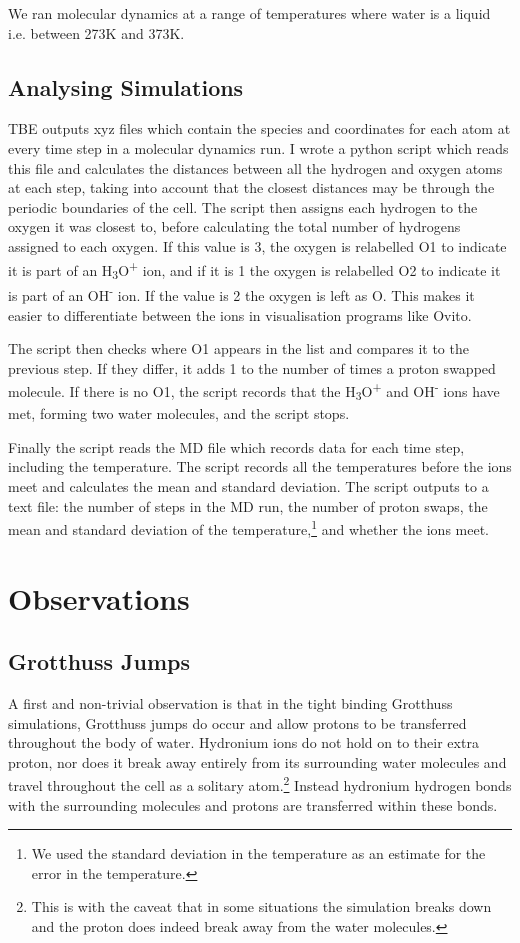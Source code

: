 \documentclass{article}
\begin{document}
\begin{multicols}{2}
We ran molecular dynamics at a range of temperatures where water is a liquid i.e. between 273K and 373K.

\subsection{Analysing Simulations}
\label{sec:analysis}
TBE outputs xyz files which contain the species and coordinates for each atom at every time step in a molecular dynamics run. I wrote a python script which reads this file and calculates the distances between all the hydrogen and oxygen atoms at each step, taking into account that the closest distances may be through the periodic boundaries of the cell. The script then assigns each hydrogen to the oxygen it was closest to, before calculating the total number of hydrogens assigned to each oxygen. If this value is 3, the oxygen is relabelled O1 to indicate it is part of an H\textsubscript{3}O\textsuperscript{+} ion, and if it is 1 the oxygen is relabelled O2 to indicate it is part of an OH\textsuperscript{-} ion. If the value is 2 the oxygen is left as O. This makes it easier to differentiate between the ions in visualisation programs like Ovito.\cite{ovito}

The script then checks where O1 appears in the list and compares it to the previous step. If they differ, it adds 1 to the number of times a proton swapped molecule. If there is no O1, the script records that the H\textsubscript{3}O\textsuperscript{+} and OH\textsuperscript{-} ions have met, forming two water molecules, and the script stops.

Finally the script reads the MD file which records data for each time step, including the temperature. The script records all the temperatures before the ions meet and calculates the mean and standard deviation. The script outputs to a text file: the number of steps in the MD run, the number of proton swaps, the mean and standard deviation of the temperature,\footnote{We used the standard deviation in the temperature as an estimate for the error in the temperature.} and whether the ions meet. 

\section{Observations}

\subsection{Grotthuss Jumps}
A first and non-trivial observation is that in the tight binding Grotthuss simulations, Grotthuss jumps do occur and allow protons to be transferred throughout the body of water. Hydronium ions do not hold on to their extra proton, nor does it break away entirely from its surrounding water molecules and travel throughout the cell as a solitary atom.\footnote{This is with the caveat that in some situations the simulation breaks down and the proton does indeed break away from the water molecules.} Instead hydronium hydrogen bonds with the surrounding molecules and protons are transferred within these bonds.


\end{multicols}
\end{document}
